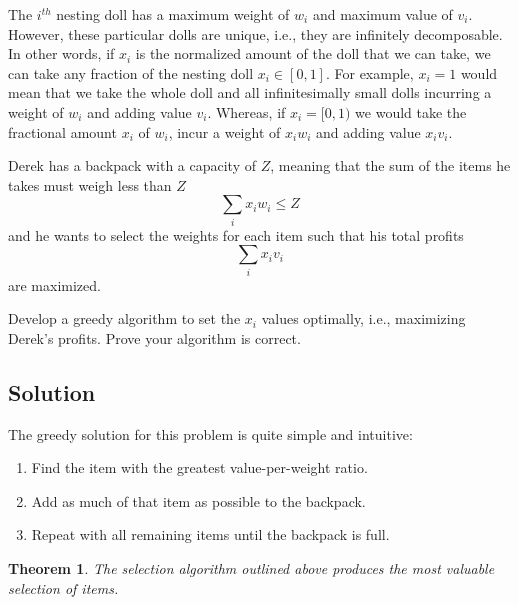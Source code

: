 \documentclass[12pt,letterpaper]{article}
\newtheorem*{thm}{Theorem}
\begin{document}
The $i^{th}$ nesting doll has a maximum weight of $w_i$ and maximum value of $v_i$.
However, these particular dolls are unique, i.e., they are infinitely decomposable. 
In other words, if $x_i$ is the normalized amount of the doll that we can take, we can take any fraction of the nesting doll $x_i \in [0,1]$.
For example, $x_i=1$ would mean that we take the whole doll and all infinitesimally small dolls incurring a weight of $w_i$ and adding value $v_i$.
Whereas, if $x_i=[0,1)$ we would take the fractional amount $x_i$ of $w_i$, incur a weight of $x_i w_i$ and adding value $x_i v_i$.

Derek has a backpack with a capacity of $Z$, meaning that the sum of the items he takes must weigh less than $Z$
\begin{equation}
    \sum_i x_i w_i \leq Z
\end{equation}
and he wants to select the weights for each item such that his total profits 
\begin{equation}
   \sum_{i} x_i v_i
\end{equation}
are maximized.

Develop a greedy algorithm to set the $x_i$ values optimally, i.e., maximizing Derek's profits.
Prove your algorithm is correct.

\subsection*{Solution}

The greedy solution for this problem is quite simple and intuitive:

\begin{enumerate}
    \item Find the item with the greatest value-per-weight ratio.
    \item Add as much of that item as possible to the backpack.
    \item Repeat with all remaining items until the backpack is full.
\end{enumerate}

\begin{thm}
    The selection algorithm outlined above produces the most valuable selection of items.
\end{thm}
\end{document}
